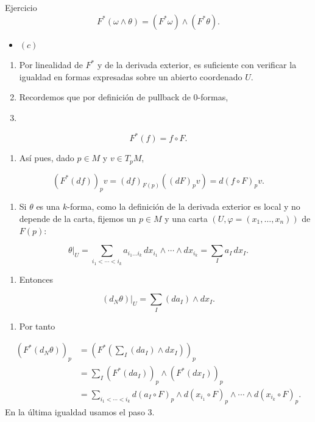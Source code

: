 \begin{bookproof}{Ejercicio}
\[
F^*(\omega\wedge\theta)=(F^*\omega)\wedge(F^*\theta).
\]
\begin{itemize}
\item $(c)$
\end{itemize}
\begin{enumerate}
\item Por linealidad de $F^*$ y de la derivada exterior, es suficiente con verificar la igualdad en formas expresadas sobre un abierto coordenado $U$.
\item Recordemos que por definición de pullback de $0$-formas,
\item 
\end{enumerate}
\[
F^*(f)=f\circ F.
\]
\begin{enumerate}[start=4]
\item Así pues, dado $p\in M$ y $v\in T_pM$,
\end{enumerate}
\[
(F^*(df))_pv=(df)_{F(p)}((dF)_pv)=d(f\circ F)_pv.
\]
\begin{enumerate}[start=5]
\item Si $\theta$ es una $k$-forma, como la definición de la derivada exterior es local y no depende de la carta, fijemos un $p\in M$ y una carta $(U,\varphi=(x_1,\ldots,x_n))$ de $F(p)$:
\end{enumerate}
\[
\theta|_U=\sum_{i_1<\cdots<i_k}a_{i_1\ldots i_k}\,dx_{i_1}\wedge\cdots\wedge dx_{i_k}=\sum_Ia_I\,dx_I.
\]
\begin{enumerate}[start=6]
\item Entonces
\end{enumerate}
\[
(d_N\theta)|_U=\sum_I(da_I)\wedge dx_I.
\]
\begin{enumerate}[start=7]
\item Por tanto
\end{enumerate}
\[
\begin{aligned}(F^*(d_N\theta))_p&=\left(F^*\left(\sum_I(da_I)\wedge dx_I\right)\right)_p\\&=\sum_I(F^*(da_I))_p\wedge(F^*(dx_I))_p\\&=\sum_{i_1<\cdots<i_k}d(a_I\circ F)_p\wedge d(x_{i_1}\circ F)_p\wedge\cdots\wedge d(x_{i_k}\circ F)_p.\end{aligned}
\]
En la última igualdad usamos el paso 3.


\end{bookproof}
